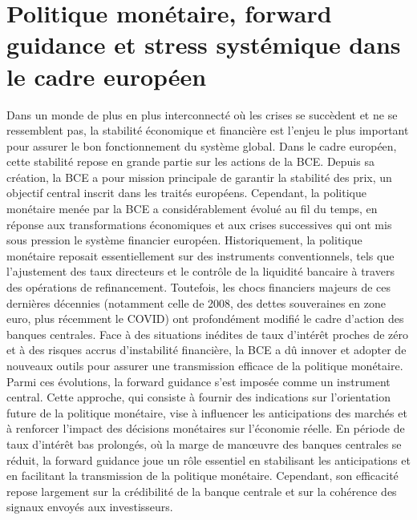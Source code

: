 \chapter{Politique monétaire, forward guidance et stress systémique dans le cadre européen}
\mtcaddchapter
\minitoc

Dans un monde de plus en plus interconnecté où les crises se succèdent et ne se ressemblent pas, la stabilité économique et financière est l'enjeu le plus important pour assurer le bon fonctionnement du système global. Dans le cadre européen, cette stabilité repose en grande partie sur les actions de la BCE. Depuis sa création, la BCE a pour mission principale de garantir la stabilité des prix, un objectif central inscrit dans les traités européens. Cependant, la politique monétaire menée par la BCE a considérablement évolué au fil du temps, en réponse aux transformations économiques et aux crises successives qui ont mis sous pression le système financier européen. Historiquement, la politique monétaire reposait essentiellement sur des instruments conventionnels, tels que l’ajustement des taux directeurs et le contrôle de la liquidité bancaire à travers des opérations de refinancement. Toutefois, les chocs financiers majeurs de ces dernières décennies (notamment celle de 2008, des dettes souveraines en zone euro, plus récemment le COVID) ont profondément modifié le cadre d’action des banques centrales. Face à des situations inédites de taux d’intérêt proches de zéro et à des risques accrus d’instabilité financière, la BCE a dû innover et adopter de nouveaux outils pour assurer une transmission efficace de la politique monétaire. Parmi ces évolutions, la forward guidance s’est imposée comme un instrument central. Cette approche, qui consiste à fournir des indications sur l’orientation future de la politique monétaire, vise à influencer les anticipations des marchés et à renforcer l’impact des décisions monétaires sur l’économie réelle. En période de taux d’intérêt bas prolongés, où la marge de manœuvre des banques centrales se réduit, la forward guidance joue un rôle essentiel en stabilisant les anticipations et en facilitant la transmission de la politique monétaire. Cependant, son efficacité repose largement sur la crédibilité de la banque centrale et sur la cohérence des signaux envoyés aux investisseurs.

